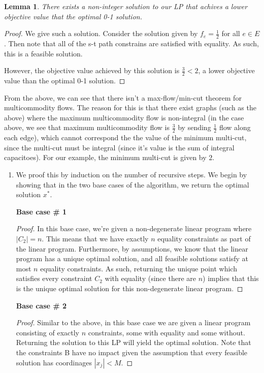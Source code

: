 \documentclass[12pt]{exam}
\newtheorem{lemma}[theorem]{Lemma}
\newcommand{\Q}[1]{\question{\large{\textbf{#1}}}}
\begin{document}
\begin{questions}
\begin{solution}
\begin{enumerate}[label=(\alph*)]
      \begin{lemma}
        There exists a non-integer solution to our LP that achives a lower objective value that the optimal 0-1 solution.
      \end{lemma}
      \begin{proof}
        We give such a solution. Consider the solution given by $f_e = \frac{1}{2}$ for all $e \in E$. Then note that all of the s-t path constrains are satisfied with equality. As such, this is a feasible solution.

        However, the objective value achieved by this solution is $\frac{3}{2} < 2$, a lower objective value than the optimal 0-1 solution.
      \end{proof}

      From the above, we can see that there isn't a max-flow/min-cut theorem for multicommodity flows. The reason for this is that there exist graphs (such as the above) where the maximum multicommodity flow is non-integral (in the case above, we see that maximum multicommodity flow is $\frac{3}{2}$ by sending $\frac{1}{2}$ flow along each edge), which cannot correspond the the value of the minimum multi-cut, since the multi-cut must be integral (since it's value is the sum of integral capacitoes). For our example, the minimum multi-cut is given by $2$.
  
  \end{enumerate}
\end{solution}

\newpage
\Q{Problem 10}
\begin{solution}
  \begin{enumerate}[label=(\alph*)]
    \item 
      We proof this by induction on the number of recursive steps. We begin by showing that in the two base cases of the algorithm, we return the optimal solution $x^*$.

      \textbf{Base case \# 1}
        \begin{proof}
        In this base case, we're given a non-degenerate linear program where $|C_2| = n$. This means that we have exactly $n$ equality constraints as part of the linear program. Furthermore, by assumptions, we know that the linear program has a unique optimal solution, and all feasible solutions satisfy at most $n$ equality constraints. As such, returning the unique point which satisfies every constraint $C_2$ with equality (since there are $n$) implies that this is the unique optimal solution for this non-degenerate linear program.
        \end{proof}
      \textbf{Base case \# 2}
        \begin{proof}
          Similar to the above, in this base case we are given a linear program consisting of exactly $n$ constraints, some with equality and some without. Returning the solution to this LP will yield the optimal solution. Note that the constraints B have no impact given the assumption that every feasible solution has coordinages $|x_j| < M$.
        \end{proof}


\end{enumerate}
\end{solution}
\end{questions}
\end{document}
